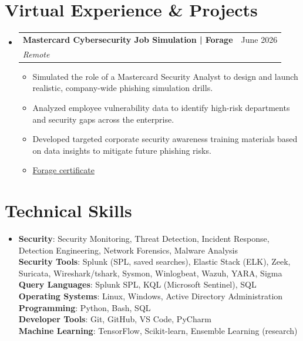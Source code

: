 \documentclass[letterpaper,11pt]{article}
\makeatletter
\newcommand{\resumeItem}[1]{
  \item\small{
    {#1 \vspace{-2pt}}
  }
}
\newcommand{\resumeSubheading}[4]{
  \vspace{-2pt}\item
    \begin{tabular*}{0.97\textwidth}[t]{l@{\extracolsep{\fill}}r}
      \textbf{#1} & #2 \\
      \textit{\small#3} & \textit{\small #4} \\
    \end{tabular*}\vspace{-7pt}
}
\newcommand{\resumeSubHeadingListStart}{\begin{itemize}[leftmargin=0.15in, label={} ]}
\newcommand{\resumeSubHeadingListEnd}{\end{itemize}}
\newcommand{\resumeItemListStart}{\begin{itemize}}
\newcommand{\resumeItemListEnd}{\end{itemize}\vspace{-5pt}}
\makeatother
\begin{document}
\section{Virtual Experience \& Projects}
\resumeSubHeadingListStart
\resumeSubheading
{Mastercard Cybersecurity Job Simulation | Forage}{June 2026}
{Remote}{}
\resumeItemListStart
\resumeItem{Simulated the role of a Mastercard Security Analyst to design and launch realistic, company-wide phishing simulation drills.}
\resumeItem{Analyzed employee vulnerability data to identify high-risk departments and security gaps across the enterprise.}
\resumeItem{Developed targeted corporate security awareness training materials based on data insights to mitigate future phishing risks.}
\resumeItem{\small\href{https://tinyurl.com/mastercardExp}{Forage certificate}}
\resumeItemListEnd
\resumeSubHeadingListEnd

\section{Technical Skills}
\begin{itemize}[leftmargin=0.15in, label={}]
\small
\item{
\textbf{Security}{: Security Monitoring, Threat Detection, Incident Response, Detection Engineering, Network Forensics, Malware Analysis} \\

\textbf{Security Tools}{: Splunk (SPL, saved searches), Elastic Stack (ELK), Zeek, Suricata, Wireshark/tshark, Sysmon, Winlogbeat, Wazuh, YARA, Sigma} \\

\textbf{Query Languages}{: Splunk SPL, KQL (Microsoft Sentinel), SQL} \\

\textbf{Operating Systems}{: Linux, Windows, Active Directory Administration} \\

\textbf{Programming}{: Python, Bash, SQL} \\

\textbf{Developer Tools}{: Git, GitHub, VS Code, PyCharm} \\

\textbf{Machine Learning}{: TensorFlow, Scikit-learn, Ensemble Learning (research)}
}
\end{itemize}
\end{document}
